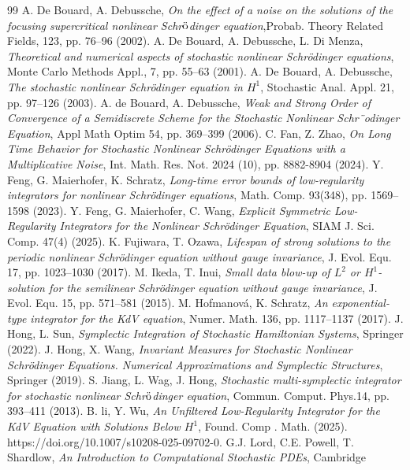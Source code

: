 \documentclass[a4paper]{amsart}
\begin{document}
\begin{thebibliography}{99}
A. De Bouard, A. Debussche, {\em On the effect of a noise on the solutions of the focusing supercritical nonlinear Schr$\ddot{\rm o}$dinger equation},Probab. Theory Related Fields, 123, pp. 76–96 (2002).
A. De Bouard, A. Debussche, L. Di Menza, {\em Theoretical and numerical aspects of stochastic
nonlinear Schrödinger equations}, Monte Carlo Methods Appl., 7, pp. 55–63 (2001).
 A. De Bouard, A. Debussche, {\em The stochastic nonlinear Schrödinger equation in $H^1$}, Stochastic Anal. Appl. 21, pp. 97--126 (2003).
A. de Bouard, A. Debussche, {\em Weak and Strong Order of Convergence of a Semidiscrete Scheme
for the Stochastic Nonlinear Schr¨odinger Equation}, Appl Math Optim 54, pp. 369--399 (2006).
 C. Fan, Z. Zhao, {\em On Long Time Behavior for Stochastic Nonlinear Schrödinger Equations with a Multiplicative Noise}, Int. Math. Res. Not. 2024 (10), pp. 8882-8904 (2024).
  Y. Feng, G. Maierhofer, K. Schratz, {\em Long-time error bounds of low-regularity integrators for nonlinear Schrödinger equations}, Math. Comp. 93(348), pp. 1569--1598 (2023).
  Y. Feng, G. Maierhofer, C. Wang, {\em Explicit Symmetric Low-Regularity Integrators for the Nonlinear Schrödinger Equation}, SIAM J. Sci. Comp. 47(4) (2025).
   K. Fujiwara, T. Ozawa, {\em Lifespan of strong solutions to the periodic nonlinear Schrödinger
equation without gauge invariance}, J. Evol. Equ. 17, pp. 1023--1030 (2017).
M. Ikeda, T. Inui, {\em Small data blow-up of $L^2$ or $H^1$-solution for the semilinear Schrödinger
equation without gauge invariance}, J. Evol. Equ. 15, pp. 571--581 (2015).
 M. Hofmanová, K. Schratz, {\em An exponential-type integrator for the KdV equation}, Numer. Math. 136, pp. 1117--1137 (2017).
  J. Hong, L. Sun, {\em Symplectic Integration of Stochastic Hamiltonian Systems}, Springer (2022).
 J. Hong, X. Wang, {\em Invariant Measures for Stochastic Nonlinear Schrödinger Equations. Numerical Approximations and Symplectic Structures}, Springer (2019).
   S. Jiang, L. Wag, J. Hong, {\em Stochastic multi-symplectic integrator for stochastic nonlinear
Schr$\ddot{\rm o}$dinger equation}, Commun. Comput. Phys.14, pp. 393--411 (2013).
B. li, Y. Wu, {\em An Unfiltered Low-Regularity Integrator for the KdV Equation with Solutions Below $H^1$}, Found. Comp . Math. (2025). https://doi.org/10.1007/s10208-025-09702-0.
 G.J. Lord, C.E. Powell, T. Shardlow, {\em An Introduction to Computational Stochastic PDEs}, Cambridge

\end{thebibliography}
\end{document}
